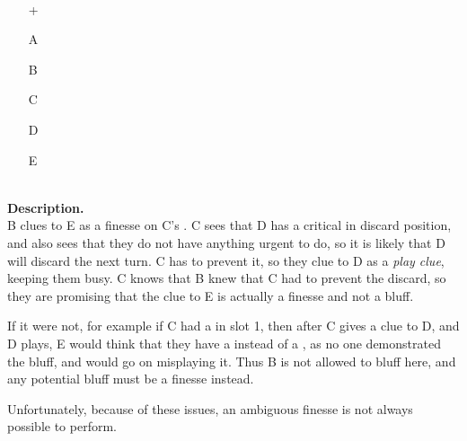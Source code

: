 \begin{example}	\hfill \\
	\begin{minipage}{0.45\textwidth}
		\begin{itemize}
			\item[\Large +]      
			\item[\Large A]    
			\item[\Large B]    
			\item[\Large C]     
			\item[\Large D]    
			\item[\Large E]    
		\end{itemize}
	\end{minipage}%
	\begin{minipage}{0.55\textwidth}
		\hfill \\
		
		\textbf{Description.} \\
		
		B clues  to E as a finesse on C's . C sees that D has a critical  in discard position, and also sees that they do not have anything urgent to do, so it is likely that D will discard the next turn. C has to prevent it, so they clue  to D as a \emph{play clue}, keeping them busy. C knows that B knew that C had to prevent the  discard, so they are promising that the  clue to E is actually a finesse and not a bluff.
		
		If it were not, for example if C had a  in slot 1, then after C gives a clue to D, and D plays, E would think that they have a  instead of a , as no one demonstrated the bluff, and would go on misplaying it. Thus B is not allowed to bluff here, and any potential bluff must be a finesse instead.
	\end{minipage}
\end{example} \vspace{0.15 cm}

Unfortunately, because of these issues, an ambiguous finesse is not always possible to perform.

